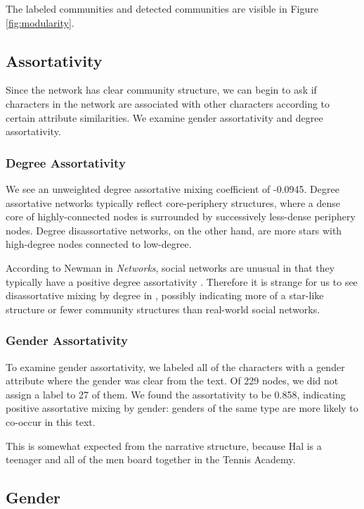 The labeled communities and detected communities are visible in Figure \ref{fig:modularity}.

\subsection{Assortativity}
Since the network has clear community structure, we can begin to ask if characters in the network are associated with other characters according to certain attribute similarities. We examine gender assortativity and degree assortativity.

\subsubsection{Degree Assortativity}
We see an unweighted degree assortative mixing coefficient of -0.0945.
Degree assortative networks typically reflect core-periphery structures, where a dense core of highly-connected nodes is surrounded by successively less-dense periphery nodes. Degree disassortative networks, on the other hand, are more stars with high-degree nodes connected to low-degree. 

According to Newman in {\em Networks}, social networks are unusual in that they typically have a positive degree assortativity \cite{NewmanBook}. 
Therefore it is strange for us to see disassortative mixing by degree in \infinitejest, possibly indicating more of a star-like structure or fewer community structures than real-world social networks.

\subsubsection{Gender Assortativity}
To examine gender assortativity, we labeled all of the characters with a gender attribute where the gender was clear from the text. Of 229 nodes, we did not assign a label to 27 of them. We found the assortativity to be 0.858, indicating positive assortative mixing by gender: genders of the same type are more likely to co-occur in this text. 

This is somewhat expected from the narrative structure, because Hal is a teenager and all of the men board together in the Tennis Academy.

\subsection{Gender}


